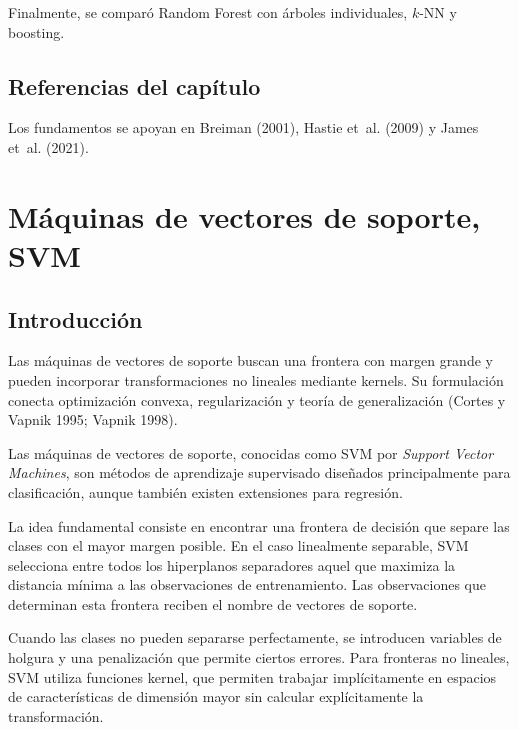 \documentclass[
  spanish,
  10.5pt,
  letterpaper,
  DIV=11,
  numbers=noendperiod,
  oneside,
  open=any]{scrreprt}
\theoremstyle{definition}
\theoremstyle{definition}
\theoremstyle{plain}
\theoremstyle{remark}
\begin{document}
Finalmente, se comparó Random Forest con árboles individuales, \(k\)-NN
y boosting.

\section*{Referencias del
capítulo}\label{referencias-del-capuxedtulo-13}


Los fundamentos se apoyan en Breiman (2001), Hastie et~al. (2009) y
James et~al. (2021).

\chapter{\texorpdfstring{Máquinas de vectores de
soporte,
SVM}{Máquinas de vectores de soporte, SVM}}\label{sec-svm}

\section*{Introducción}\label{introducciuxf3n-15}


Las máquinas de vectores de soporte buscan una frontera con
margen grande y pueden incorporar transformaciones no
lineales mediante kernels. Su formulación conecta
optimización convexa, regularización y teoría de generalización (Cortes
y Vapnik 1995; Vapnik 1998).

Las máquinas de vectores de soporte, conocidas como SVM por
\emph{Support Vector Machines}, son métodos de aprendizaje supervisado
diseñados principalmente para clasificación, aunque también existen
extensiones para regresión.

La idea fundamental consiste en encontrar una frontera de decisión que
separe las clases con el mayor margen posible. En el caso linealmente
separable, SVM selecciona entre todos los hiperplanos separadores aquel
que maximiza la distancia mínima a las observaciones de entrenamiento.
Las observaciones que determinan esta frontera reciben el nombre de
vectores de soporte.

Cuando las clases no pueden separarse perfectamente, se introducen
variables de holgura y una penalización que permite ciertos errores.
Para fronteras no lineales, SVM utiliza funciones kernel, que permiten
trabajar implícitamente en espacios de características de dimensión
mayor sin calcular explícitamente la transformación.
\end{document}
